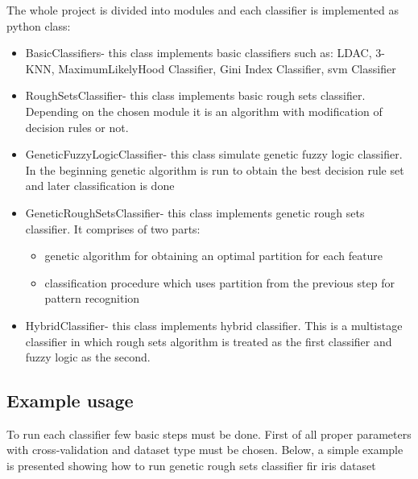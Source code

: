 The whole project is divided into modules and each classifier is implemented as
python class:
\begin{itemize}
    \item BasicClassifiers- this class implements basic classifiers such as:
        LDAC, 3-KNN, MaximumLikelyHood Classifier, Gini Index Classifier, svm
        Classifier
    \item RoughSetsClassifier- this class implements basic rough sets
        classifier. Depending on the chosen module it is an algorithm with
        modification of decision rules or not.
    \item GeneticFuzzyLogicClassifier- this class simulate genetic fuzzy logic
        classifier. In the beginning genetic algorithm is run to obtain the
        best decision rule set and later classification is done
    \item GeneticRoughSetsClassifier- this class implements genetic rough sets
        classifier. It comprises of two parts:
        \begin{itemize}
            \item genetic algorithm for obtaining an optimal partition for each
                feature
            \item classification procedure which uses partition from the
                previous step for pattern recognition
        \end{itemize}
    \item HybridClassifier- this class implements hybrid classifier. This is a
        multistage classifier in which rough sets algorithm is treated as the
        first classifier and fuzzy logic as the second.
\end{itemize}
\subsection{Example usage}
To run each classifier few basic steps must be done. First of all proper
parameters with cross-validation and dataset type must be chosen. Below, a
simple example is presented showing how to run genetic rough sets classifier
fir iris dataset

